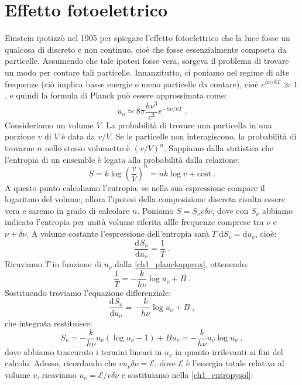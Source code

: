 \documentclass[10pt,a4paper]{report}
\theoremstyle{definition}
\newcommand{\dev}[3][]{\frac{\mathrm{d}^{#1} #2}{\mathrm{d} #3^{#1}}}
\numberwithin{equation}{section}
\newcommand{\diff}[1][]{\mathrm{d}#1}
\begin{document}
\section{Effetto fotoelettrico}
Einstein ipotizzò nel 1905 per spiegare l'effetto fotoelettrico che la luce fosse un qualcosa di discreto e non continuo, cioè che fosse essenzialmente composta da particelle. Assumendo che tale ipotesi fosse vera, sorgeva il problema di trovare un modo per contare tali particelle. Innanzitutto, ci poniamo nel regime di alte frequenze (ciò implica basse energie e meno particelle da contare), cioè $e^{h\nu/kT}\gg 1$, e quindi la formula di Planck può essere approssimata come:
\begin{equation}
u_{\nu}\simeq 8\pi \frac{h\nu^3}{c^3}e^{-h\nu/kT}\;. \label{ch1_planckapprox}
\end{equation}
Consideriamo un volume $V$. La probabilità di trovare una particella in una porzione $v$ di $V$ è data da $v/V$. Se le particelle non interagiscono, la probabilità di trovarne $n$ nello stesso volumetto è $(v/V)^n$. Sappiamo dalla statistica che l'entropia di un ensemble è legata alla probabilità dalla relazione:
\begin{equation}
S=k\log\left(\frac{v}{V}\right)^n=nk\log v+\mathrm{cost}\;.
\end{equation}
A questo punto calcoliamo l'entropia: se nella sua espressione compare il logaritmo del volume, allora l'ipotesi della composizione discreta risulta essere vera e saremo in grado di calcolare $n$. Poniamo $S=S_{\nu}v \delta\nu$, dove con $S_{\nu}$ abbiamo indicato l'entropia per unità volume riferita allle frequenze comprese tra $\nu$ e $\nu+\delta\nu$. A volume costante l'espressione dell'entropia sarà $T\;\diff{S_{\nu}}=\diff{u_{\nu}}$, cioè:
$$
\dev{S_{\nu}}{u_{\nu}}=\frac{1}{T}\;.
$$
Ricaviamo $T$ in funzione di $u_{\nu}$ dalla \eqref{ch1_planckapprox}, ottenendo:
\begin{equation}
\frac{1}{T}=-\frac{k}{h\nu}\log u_{\nu}+B\;.
\end{equation}
Sostituendo troviamo l'equazione differenziale:
$$
\dev{S_{\nu}}{u_{\nu}}=-\frac{k}{h\nu}\log u_{\nu}+B\;,
$$
che integrata restituisce:
\begin{equation}
S_{\nu}=-\frac{k}{h\nu}u_{\nu}(\log u_{\nu}-1)+Bu_{\nu}=-\frac{k}{h\nu}u_{\nu}\log u_{\nu}\;, \label{ch1_entropysol}
\end{equation}
dove abbiamo trascurato i termini lineari in $u_{\nu}$ in quanto irrilevanti ai fini del calcolo. Adesso, ricordando che $v u_{\nu}\delta\nu=\mathcal{E}$, dove $\mathcal{E}$ è l'energia totale relativa al volume $v$, ricaviamo $u_{\nu}=\mathcal{E}/v\delta\nu$ e sostituiamo nella \eqref{ch1_entropysol}:
\end{document}
